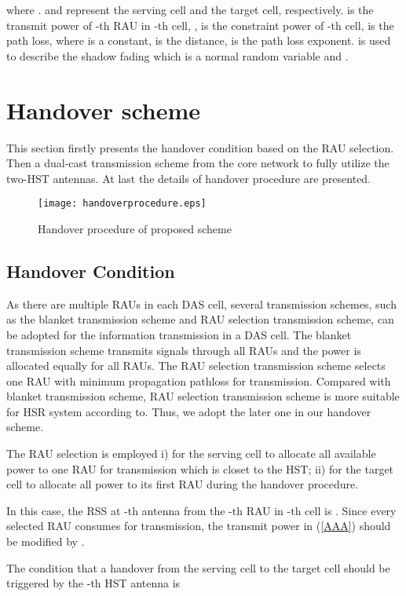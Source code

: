 \documentclass[a4paper,twocolumn,10pt]{IEEEtran}
\newcommand{\picspace}{{\vspace{-0.1 in}}}
\begin{document}
where .  and  represent the serving cell and the target cell, respectively.  is the transmit power of -th RAU in -th cell, ,  is the constraint power of -th cell,  is the path loss, where  is a constant,  is the distance,  is the path loss exponent.  is used to describe the shadow fading which is a normal random variable and .


\section{Handover scheme}

This section firstly presents the handover condition based on the RAU selection. Then a dual-cast transmission scheme from the core network to fully utilize the two-HST antennas. At last the details of handover procedure are presented.

\begin{figure}
\centering
\texttt{[image: handoverprocedure.eps]}
\caption{Handover procedure of proposed scheme}\picspace
\label{procedure}
\end{figure}
\subsection{Handover Condition}
As there are multiple RAUs in each DAS cell, several transmission schemes, such as the blanket transmission scheme and RAU selection transmission scheme\textcolor[rgb]{0,0,0}{\cite{RAU}}, can be adopted for the information transmission in a DAS cell. The blanket transmission scheme transmits signals through all RAUs and the power is allocated equally for all RAUs. The RAU selection transmission scheme selects one RAU with minimum propagation pathloss for transmission. Compared with blanket transmission scheme, RAU selection transmission scheme is more suitable for HSR system according to\textcolor[rgb]{0,0,0}{\cite{RAU2}}. Thus, we adopt the later one in our handover scheme.

The RAU selection is employed i) for the serving cell to allocate all available power to one RAU for transmission which is closet to the HST;  ii) for the target cell to allocate all power to its first RAU during the handover procedure.

In this case, the RSS at  -th antenna from the -th RAU in -th cell is . Since every selected RAU consumes  for transmission, the transmit power  in (\ref{AAA}) should be modified by .

The condition that a handover from the serving cell to the target cell should be triggered by the -th HST antenna is
\end{document}
